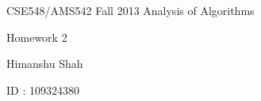 \documentclass[letterpaper,portrait,12pt]{article}
\begin{document}
\setlength{\oddsidemargin}{0.6250in-1in}

\begin{center}

\end{center}


\begin{center}

\end{center}


\begin{center}

\end{center}


\begin{center}

\end{center}


\begin{center}
{\huge CSE548/AMS542 Fall 2013 Analysis of Algorithms}
\end{center}


\begin{center}

\end{center}


\begin{center}
{\huge Homework }{\huge 2}
\end{center}


\begin{center}
{\huge Himanshu Shah}
\end{center}


\begin{center}
{\huge ID : 109324380}
\end{center}


\begin{center}

\end{center}


\begin{center}

\end{center}


\begin{center}

\end{center}


\begin{center}

\end{center}


\begin{center}

\end{center}
\end{document}
